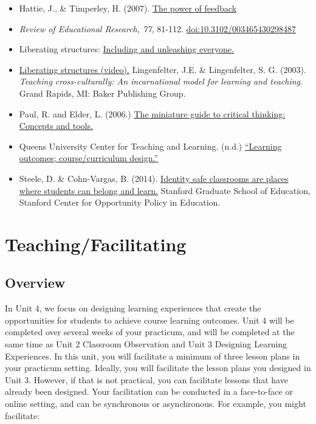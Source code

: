 \documentclass[
]{book}
\providecommand{\tightlist}{%
  \setlength{\itemsep}{0pt}\setlength{\parskip}{0pt}}
\begin{document}
\begin{itemize}
\tightlist
\item
  Hattie, J., \& Timperley, H. (2007). \href{http://education.qld.gov.au/staff/development/performance/resources/readings/power-feedback.pdf}{The power of feedback}\\
\item
  \emph{Review of Educational Research, 77,} 81-112. \url{doi:10.3102/003465430298487}\\
\item
  Liberating structures: \href{http://www.liberatingstructures.com/}{Including and unleashing everyone.}\\
\item
  \href{http://www.liberatingstructures.com/}{Liberating structures (video).}
  Lingenfelter, J.E. \& Lingenfelter, S. G. (2003). \emph{Teaching cross-culturally: An incarnational model for learning and teaching.} Grand Rapids, MI: Baker Publishing Group.\\
\item
  Paul, R. and Elder, L. (2006.) \href{https://www.criticalthinking.org/files/Concepts_Tools.pdf}{The miniature guide to critical thinking: Concepts and tools.}\\
\item
  Queens University Center for Teaching and Learning. (n.d.)
  \href{http://www.queensu.ca/ctl/teaching-support/course-and-program-design}{``Learning outcomes; course/curriculum design.''}\\
\item
  Steele, D. \& Cohn-Vargas, B. (2014). \href{https://edpolicy.stanford.edu/library/video/1196}{Identity safe classrooms are places where students can belong and learn.} Stanford Graduate School of Education, Stanford Center for Opportunity Policy in Education.
\end{itemize}

\hypertarget{teachingfacilitating}{%
\chapter{Teaching/Facilitating}\label{teachingfacilitating}}

\hypertarget{overview-4}{%
\section*{Overview}\label{overview-4}}

In Unit 4, we focus on designing learning experiences that create the opportunities for students to achieve course learning outcomes. Unit 4 will be completed over several weeks of your practicum, and will be completed at the same time as Unit 2 Classroom Observation and Unit 3 Designing Learning Experiences.
In this unit, you will facilitate a minimum of three lesson plans in your practicum setting. Ideally, you will facilitate the lesson plans you designed in Unit 3. However, if that is not practical, you can facilitate lessons that have already been designed. Your facilitation can be conducted in a face-to-face or online setting, and can be synchronous or asynchronous. For example, you might facilitate:
\end{document}
